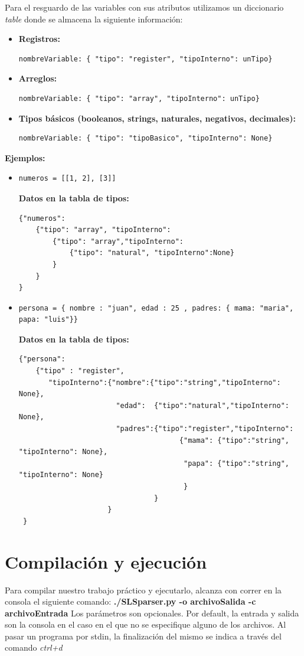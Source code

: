 \documentclass[10pt,a4paper]{article}
\begin{document}
Para el resguardo de las variables con sus atributos utilizamos un diccionario \textit{table} donde se almacena la siguiente información: 
\begin{itemize}
\item \textbf{Registros:}
\begin{verbatim}
nombreVariable: { "tipo": "register", "tipoInterno": unTipo}
\end{verbatim}
\item \textbf{Arreglos:}
\begin{verbatim}
nombreVariable: { "tipo": "array", "tipoInterno": unTipo}
\end{verbatim}

\item \textbf{Tipos básicos (booleanos, strings, naturales, negativos, decimales):}
\begin{verbatim}
nombreVariable: { "tipo": "tipoBasico", "tipoInterno": None}
\end{verbatim}
\end{itemize}
\textbf{Ejemplos:}
\begin{itemize}
\item 
\begin{verbatim}
numeros = [[1, 2], [3]]
\end{verbatim}
\textbf{Datos en la tabla de tipos:}
\begin{verbatim}
{"numeros": 
    {"tipo": "array", "tipoInterno": 
        {"tipo": "array","tipoInterno":
            {"tipo": "natural", "tipoInterno":None}
        }
    }
}
\end{verbatim}
\item 
\begin{verbatim}
persona = { nombre : "juan", edad : 25 , padres: { mama: "maria", papa: "luis"}}
\end{verbatim}
\textbf{Datos en la tabla de tipos:}
\begin{verbatim}
{"persona": 
    {"tipo" : "register",
       "tipoInterno":{"nombre":{"tipo":"string","tipoInterno": None},
                       "edad":  {"tipo":"natural","tipoInterno": None},
                       "padres":{"tipo":"register","tipoInterno":
                                      {"mama": {"tipo":"string", "tipoInterno": None},
                                       "papa": {"tipo":"string", "tipoInterno": None}
                                       }
                                }
                     }
 }
\end{verbatim}
\end{itemize}
\section{Compilación y ejecución}
Para compilar nuestro trabajo práctico y ejecutarlo, alcanza con correr en la consola el siguiente comando:
\textbf{./SLSparser.py -o archivoSalida -c archivoEntrada} 
Los parámetros son opcionales. Por default, la entrada y salida son la consola en el caso en el que no se especifique alguno de los archivos.
Al pasar un programa por stdin, la finalización del mismo se indica a través del comando \textit{ctrl+d}
\end{document}
